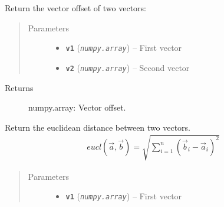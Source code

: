 \documentclass[letterpaper,10pt,english]{sphinxmanual}
\begin{document}
\begin{fulllineitems}
\begin{fulllineitems}
\begin{quote}
\begin{description}
\end{description}\end{quote}

\end{fulllineitems}


\begin{fulllineitems}
\label{src.mapping:src.mapping.mapthreading.MappingWorkerThread.distance}
Return the vector offset of two vectors:
\begin{quote}\begin{description}
\item[{Parameters}] \leavevmode\begin{itemize}
\item {} 
\textbf{\texttt{v1}} (\emph{\texttt{numpy.array}}) -- First vector

\item {} 
\textbf{\texttt{v2}} (\emph{\texttt{numpy.array}}) -- Second vector

\end{itemize}

\end{description}\end{quote}
\begin{description}
\item[{Returns}] \leavevmode
numpy.array: Vector offset.

\end{description}

\end{fulllineitems}


\begin{fulllineitems}
\label{src.mapping:src.mapping.mapthreading.MappingWorkerThread.euclidean_distance1}
Return the euclidean distance between two vectors.
\begin{equation*}
\begin{split}eucl(\vec{a}, \vec{b}) = \sqrt{\sum_{i=1}^n (\vec{b}_i - \vec{a}_i)^2}\end{split}
\end{equation*}\begin{quote}\begin{description}
\item[{Parameters}] \leavevmode\begin{itemize}
\item {} 
\textbf{\texttt{v1}} (\emph{\texttt{numpy.array}}) -- First vector


\end{itemize}
\end{description}
\end{quote}
\end{fulllineitems}
\end{fulllineitems}
\end{document}

